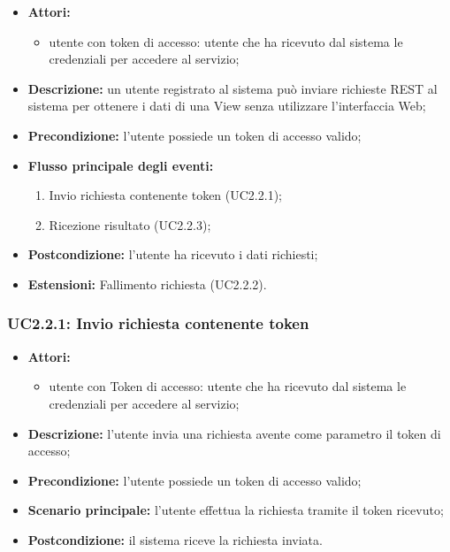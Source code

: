 \begin{itemize}
	\item \textbf{Attori:}
	\begin{itemize}
		\item utente con token di accesso: utente che ha ricevuto dal sistema le credenziali per accedere al servizio;
	\end{itemize}
	\item \textbf{Descrizione:} un utente registrato al sistema può inviare richieste REST al sistema per ottenere i dati di una View senza utilizzare l'interfaccia Web;
	\item \textbf{Precondizione:} l'utente possiede un token di accesso valido;
	\item \textbf{Flusso principale degli eventi:}
	\begin{enumerate}
		\item Invio richiesta contenente token (UC2.2.1);
		\item Ricezione risultato (UC2.2.3);
	\end{enumerate}
	\item \textbf{Postcondizione:} l'utente ha ricevuto i dati richiesti;
	\item \textbf{Estensioni:} Fallimento richiesta (UC2.2.2).
\end{itemize}

\subsubsection{UC2.2.1: Invio richiesta contenente token}
\begin{itemize}
	\item \textbf{Attori:}
	\begin{itemize}
		\item utente con Token di accesso: utente che ha ricevuto dal sistema le credenziali per accedere al servizio;
	\end{itemize}
	\item \textbf{Descrizione:} l'utente invia una richiesta avente come parametro il token di accesso;
	\item \textbf{Precondizione:} l'utente possiede un token di accesso valido;
	\item \textbf{Scenario principale:} l'utente effettua la richiesta tramite il token ricevuto;
	\item \textbf{Postcondizione:} il sistema riceve la richiesta inviata.
\end{itemize}

